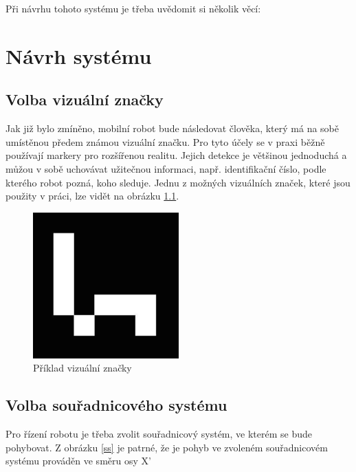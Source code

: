 \documentclass[twoside]{ctuthesis}
\theoremstyle{plain}
\theoremstyle{definition}
\theoremstyle{note}
\begin{document}
Při návrhu tohoto systému je třeba uvědomit si několik věcí:


\chapter{Návrh systému}
\section{Volba vizuální značky}
Jak již bylo zmíněno, mobilní robot bude následovat člověka, který má na sobě umístěnou předem známou vizuální značku. Pro tyto účely se v praxi běžně používají markery pro rozšířenou realitu. Jejich detekce je většinou jednoduchá a můžou v sobě uchovávat užitečnou informaci, např. identifikační číslo, podle kterého robot pozná, koho sleduje. Jednu z možných vizuálních značek, které jsou použity v práci, lze vidět na obrázku \ref{am}.

\begin{figure}[H]
	\caption{Příklad vizuální značky}
	
	\label{am}
	\includegraphics[width=0.5\textwidth]{images/2/ArucoMarker.jpg}
\end{figure}

\section{Volba souřadnicového systému}

Pro řízení robotu je třeba zvolit souřadnicový systém, ve kterém se bude pohybovat. Z obrázku \ref{ss} je patrné, že je pohyb ve zvoleném souřadnicovém systému prováděn ve směru osy X'
\end{document}
